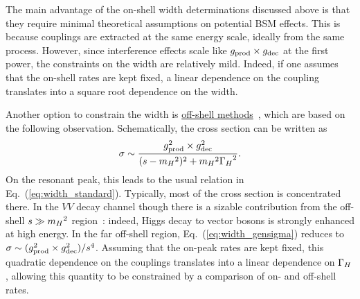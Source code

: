 The main advantage of the on-shell width determinations discussed above is that they require minimal theoretical assumptions on potential
BSM effects. This is because couplings are extracted at the same energy scale, ideally
from the same process. However, since interference effects scale like 
$g_{\rm prod}\times g_{\rm dec}$ at the first power, the constraints on the width are relatively mild.
Indeed, if one assumes that the on-shell rates are kept fixed, a linear dependence on the coupling 
translates into a square root dependence on the width. 

Another option to constrain the width is 
\underline{off-shell methods}~\cite{Kauer:2012hd,Caola:2013yja,Campbell:2013una,Campbell:2013wga}, 
which are based on the following observation.
Schematically, the cross section can be written as
\begin{equation}
\sigma \sim \frac{g_{\rm prod}^2 \times g_{\rm dec}^2}{(s-{m_H}^2)^2 + {m_H}^2 {\Gamma_H}^2}.
\label{eq:width_gensigma}
\end{equation}
On the resonant peak, this leads to the usual relation in Eq.~(\ref{eq:width_standard}). Typically,
most of the cross section is concentrated there. In the $VV$ decay channel though there is a sizable
contribution from the off-shell $s \gg {m_H}^2$ region~\cite{Kauer:2012hd}: 
indeed, Higgs decay to vector bosons is 
strongly enhanced at high energy. In the far
off-shell region, Eq.~(\ref{eq:width_gensigma}) reduces to 
$\sigma\sim (g_{\rm prod}^2\times g_{\rm dec}^2)/s^4$. Assuming that the on-peak rates are kept
fixed, this quadratic dependence on the couplings translates into a linear dependence on ${\Gamma_H}$, allowing this quantity
to be constrained by a comparison of on- and off-shell rates. 

